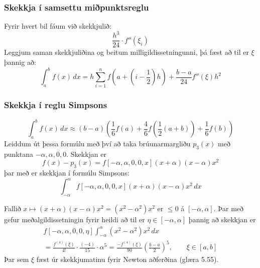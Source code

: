 \documentclass[icelandic,a4paper,12pt]{article}
\begin{document}
\subsubsection{Skekkja í samsettu miðpunktsreglu}
Fyrir hvert bil fáum við skekkjulið:
\begin{equation*}
  \frac{h^3}{24}\cdot f''(\xi_i)
\end{equation*}
\pause
Leggjum saman skekkjuliðina og beitum milligildissetningunni, þá fæst
að til er $\xi$ þannig að:
\begin{equation*}
  \int_a^b f(x)\,dx = h \sum_{i=1}^n 
  f\left(a+ (i - \frac{1}{2})h\right) + \frac{b-a}{24}f''(\xi)h^2
\end{equation*} 



\subsubsection{Skekkja í reglu Simpsons} 
\begin{equation*}
  \int_a^b f(x)\,dx \approx (b-a) 
  \left( 
    \frac{1}{6}f(a) + \frac{4}{6}f
    \left( \frac{1}{2}(a+b) \right) + \frac{1}{6}f(b)
  \right)
\end{equation*}
\pause
Leiddum út þessa formúlu með því að taka brúunarmargliðu $p_3(x)$ með
punktana $-\alpha, \alpha, 0, 0$. Skekkjan er 
\begin{equation*}
  f(x) - p_3(x) = f[-\alpha, \alpha, 0, 0, x]
  (x+\alpha)(x-\alpha)x^2
\end{equation*}
\pause
þar með er skekkjan í formúlu Simpsons:
\begin{equation*}
  \int_{-\alpha}^{\alpha}f[-\alpha, \alpha, 0, 0, x]
  (x+\alpha)(x-\alpha)x^2 \,dx
\end{equation*}



Fallið $x\mapsto (x+\alpha)(x-\alpha)x^2 = (x^2 - \alpha^2)x^2$ er
$\leq 0$ á $[-\alpha, \alpha]$. Þar með gefur meðalgildissetningin
fyrir heildi að til er $\eta \in [-\alpha, \alpha]$ þannig að skekkjan
er 
\begin{multline*}
  f[-\alpha, \alpha, 0, 0, \eta]
  \int_{-\alpha}^{\alpha}(x^2 - \alpha^2)x^2 \,dx \\
  = \frac{f^{(4)}(\xi)}{4!}\cdot \frac{(-4)}{15}\cdot \alpha^5
  = \frac{-f^{(4)}(\xi)}{90}\left(\frac{b-a}{2}\right)^5, \qquad 
  \xi \in [a,b]
\end{multline*}
Þar sem $\xi$ fæst úr
skekkjumatinu fyrir Newton aðferðina (glæra 5.55).
\end{document}
